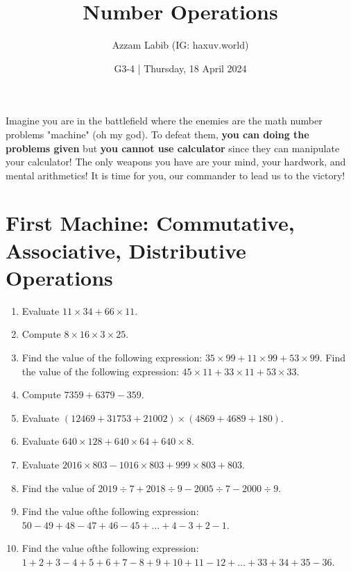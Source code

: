\documentclass[11pt]{scrartcl}
\title{Number Operations}
\author{Azzam Labib (IG: haxuv.world)}
\date{G3-4 | Thursday, 18 April 2024}
\begin{document}
\maketitle
\begin{tcolorbox}[colback=blue!10,colframe=blue!75!black]
Imagine you are in the battlefield where the enemies are the math number problems "machine" (oh my god). To defeat them, \textbf{you can doing the problems given} but \textbf{you cannot use calculator} since they can manipulate your calculator! The only weapons you have are your mind, your hardwork, and mental arithmetics! It is time for you, our commander to lead us to the victory!
\end{tcolorbox}




\section{First Machine: Commutative, Associative, Distributive Operations}
\begin{enumerate}
\item Evaluate $11 \times 34 + 66 \times 11$.
\vspace{3cm} \item Compute $8 \times 16 \times 3 \times 25$.
\vspace{3cm} \item Find the value of the following expression: $35 \times 99 + 11 \times 99 + 53 \times 99$.
Find the value of the following expression: $45 \times 11 + 33 \times 11 + 53 \times 33$.
\vspace{3cm} \item Compute $7359 + 6379 - 359$.
\vspace{3cm} \item Evaluate
$(12469+31753+21002) \times (4869+4689+180)$.
\vspace{3cm} \item Evaluate $640 \times 128 + 640 \times 64 + 640 \times 8$.
\vspace{3cm} \item Evaluate $2016 \times 803 - 1016 \times 803 + 999 \times 803 + 803$.
\vspace{3cm} \item Find the value of $2019 \div 7 + 2018 \div 9 - 2005 \div 7 - 2000 \div 9$.
\vspace{3cm} \item Find the value ofthe following expression:
$50-49+48-47+46-45+\dots+4-3+2-1$.
\vspace{3cm} \item Find the value ofthe following expression:\\
$1+2+3-4+5+6+7-8+9+10+11-12+\dots+33+34+35-36$.
\end{enumerate}
\end{document}
